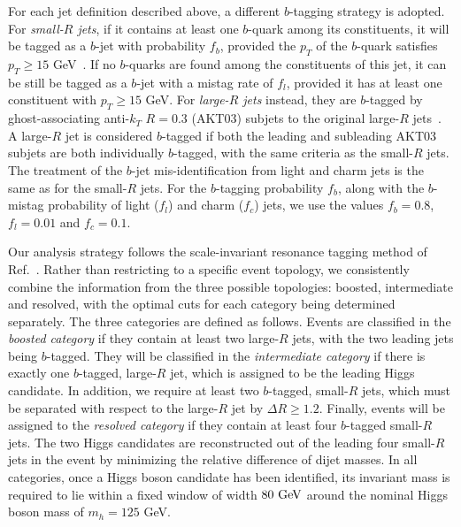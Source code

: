 \documentclass[a4paper,10pt]{article}
\begin{document}
For each jet definition described above, a different
$b$-tagging strategy is adopted.
%
For  {\it small-$R$ jets}, if it contains at least one $b$-quark among its constituents,
it will be tagged as a $b$-jet with probability $f_b$, provided
the $p_T$ of the $b$-quark
  satisfies $p_T \ge 15$ GeV~\cite{Aad:2015ydr}.
  If no $b$-quarks are found among the constituents
  of this jet, it can be still be tagged as a $b$-jet with
  a mistag rate of $f_l$, provided it has at least one
  constituent
  with $p_T \ge 15$ GeV.
 For {\it large-$R$ jets} instead, they are $b$-tagged by
    ghost-associating anti-$k_T$ $R=0.3$ (AKT03)
    subjets to the original large-$R$
    jets~\cite{Cacciari:2007fd,Aad:2013gja,
      ATLAS-CONF-2014-004,Aad:2015uka}.
    A large-$R$ jet is considered $b$-tagged if both
    the leading and subleading AKT03 subjets are both individually $b$-tagged,
    with the same criteria as the small-$R$ jets.
     The treatment of the $b$-jet mis-identification
    from light and charm jets
    is the same as for the small-$R$ jets.
For the $b$-tagging probability $f_b$, along with
the $b$-mistag probability of light ($f_l$) and charm ($f_c$) jets,
we use the values $f_b=0.8$, $f_l=0.01$
and  $f_c=0.1$.



Our analysis strategy follows the
scale-invariant resonance tagging method of Ref.~\cite{Gouzevitch:2013qca}.
%
Rather than restricting to a specific event topology,
we consistently combine the information from
the three possible topologies: boosted, intermediate and
resolved, with the optimal cuts for each category being determined
separately.
%
The three categories are defined as follows.
%
Events are classified in the {\it boosted category} if they 
  contain at least two large-$R$ jets, with the two leading jets
  being $b$-tagged.
  They will be classified in the
 {\it intermediate category} if there is exactly one  $b$-tagged, large-$R$ jet, which
  is assigned to be the leading Higgs candidate.
  In addition, we require at least two $b$-tagged, small-$R$ jets,
  which must be separated with respect to the large-$R$ jet
  by  $\Delta R\ge 1.2$.
  Finally, events will be assigned to the {\it resolved category}
  if they contain at least
  four $b$-tagged small-$R$ jets.
  The two Higgs candidates are reconstructed out of the
  leading four small-$R$ jets in the event by minimizing the relative difference of
  dijet masses.
  In all categories, once a Higgs boson candidate has been identified,
its invariant mass is required to lie within a fixed window
of width $80~{\rm GeV}$ around the nominal Higgs boson mass of $m_h= 125$
GeV.
%
\end{document}
